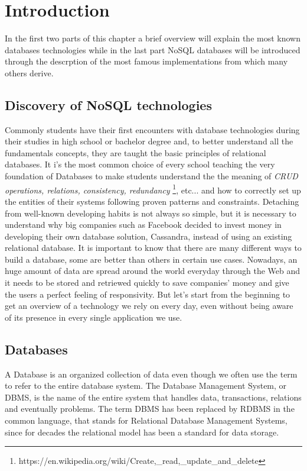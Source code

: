 \chapter{Introduction}
\label{cha:intro}

In the first two parts of this chapter a brief overview will explain the most known databases technologies while in the last part NoSQL databases will be introduced through the descrption of the most famous implementations from which many others derive.


\section{Discovery of NoSQL technologies}
\label{sec:context}

Commonly students have their first encounters with database technologies during their studies in high school or bachelor degree and, to better understand all the fundamentals concepts, they are taught the basic principles of relational databases.
It i’s the most common choice of every school teaching the very foundation of Databases to make students understand the the meaning of \textit{CRUD operations, relations, consistency, redundancy} \footnote{https://en.wikipedia.org/wiki/Create,\_read,\_update\_and\_delete}, etc... and how to correctly set up the entities of their systems following proven patterns and constraints.
Detaching from well-known developing habits is not always so simple, but it is necessary to understand why big companies such as Facebook decided to invest money in developing their own database solution, Cassandra, instead of using an existing relational database.
It is important to know that there are many different ways to build a database, some are better than others in certain use cases. Nowadays, an huge amount of data are spread around the world everyday through the Web and it needs to be stored and retriewed quickly to save companies' money and give the users a perfect feeling of responsivity\cite{ictbusiness}.
But let’s start from the beginning to get an overview of a technology we rely on every day, even without being aware of its presence in every single application we use.


\section{Databases}
\label{sec:problem}

A Database is an organized collection of data even though we often use the term to refer to the entire database system. The Database Management System, or DBMS, is the name of the entire system that handles data, transactions, relations and eventually problems.
The term DBMS has been replaced by RDBMS in the common language, that stands for Relational Database Management Systems, since for decades the relational model has been a standard for data storage.


